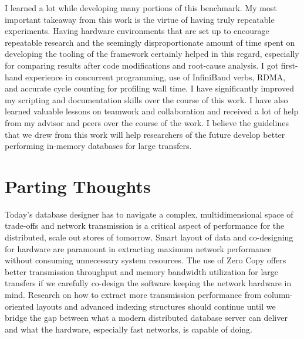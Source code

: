 I learned a lot while developing many portions of this benchmark. My most important takeaway from this work 
is the virtue of having truly repeatable experiments. Having hardware environments that are set up to encourage 
repeatable research and the seemingly disproportionate amount of time spent on developing the tooling of the 
framework certainly helped in this regard, especially for comparing results after code modifications and root-cause analysis.
I got first-hand experience in concurrent programming, use of InfiniBand verbs, RDMA, and accurate cycle counting 
for profiling wall time. I have significantly improved my scripting and documentation skills over the course of this work. 
I have also learned valuable lessons on teamwork and collaboration and received a lot of help from my 
advisor and peers over the course of the work. I believe the guidelines that we drew from this work will 
help researchers of the future develop better performing in-memory databases for large transfers. 

\section{Parting Thoughts}
Today's database designer has to navigate a complex, multidimensional space of trade-offs and network transmission 
is a critical aspect of performance for the distributed, scale out stores of tomorrow. Smart layout of data and  
co-designing for hardware are paramount in extracting maximum network performance without consuming 
unnecessary system resources. The use of Zero Copy offers better transmission throughput and memory bandwidth utilization for 
large transfers if we carefully co-design the software keeping the network hardware in mind. Research on how to extract 
more transmission performance from column-oriented layouts and advanced indexing structures should continue until we bridge the 
gap between what a modern distributed database server can deliver and what the hardware, especially fast networks, is capable of doing.